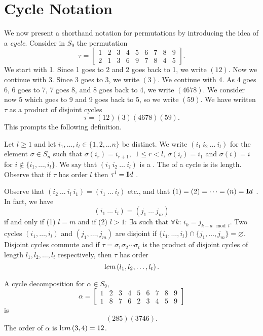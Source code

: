 \section{Cycle Notation} We now present a
shorthand notation for permutations by introducing the idea of a
{\em cycle}. Consider in $S_9$ the permutation
$$\tau = \begin{bmatrix} 1 & 2 & 3 & 4 & 5 & 6 & 7 & 8 & 9 \\
2 & 1 & 3 & 6 & 9 & 7 & 8 & 4 & 5 \end{bmatrix}.$$ We start with
1. Since 1 goes to 2 and 2 goes back to 1, we write $(12)$. Now we
continue with 3. Since 3 goes to 3, we write $(3)$. We continue
with 4. As 4 goes 6, 6 goes to 7, 7 goes 8, and 8 goes back to 4,
we write $(4678)$. We consider now $5$ which goes to 9 and 9 goes
back to 5, so we write $(59)$. We have written $\tau$ as a product
of disjoint cycles
$$\tau = (12)(3)(4678)(59).$$This prompts the following
definition.
\begin{df}
Let $l\geq 1$ and let $i_1,\ldots,i_l\in\{1,2,\ldots n\}$ be
distinct. We write  $(i_1\ i_2\ \ldots\ i_l)$ for the element
$\sigma\in S_n$ such that $\sigma(i_r)=i_{r+1}, \ \ 1\leq r<l$,
$\sigma(i_l)=i_1$ and  $\sigma(i)=i$ for
$i\not\in\{i_1,\ldots,i_l\}$. We say that  $(i_1\ i_2\ \ldots\
i_l)$ is a . The  of a cycle
is its length. Observe that if $\tau$ has order $l$ then $\tau^l =
{\mathbf Id\ }$.\end{df}
\begin{rem}
Observe that $(i_2\ \ldots\ i_l\ i_1)=(i_1\ \ldots\ i_l)$ etc.,
and that $(1)=(2)=\cdots=(n)= {\mathbf Id\ }$. In fact, we have
$$(i_1\ \ldots\ i_l)=(j_1\ \ldots\ j_m)$$ if and only if (1) $l=m$
and if  (2) $l>1$: $\exists a$ such that $\forall k$: $i_k =
j_{k+a \mod l}$. Two cycles $(i_1,\ldots,i_l)$ and
$(j_1,\ldots,j_m)$ are disjoint if $\{i_1, \ldots ,
i_l\}\cap\{j_1,  \ldots , j_m\}=\varnothing$. Disjoint cycles
commute and if $\tau = \sigma_1\sigma_2 \cdots \sigma_t$ is the
product of disjoint cycles of length $l_1, l_2, \ldots , l_t$
respectively, then $\tau$ has order
$$ {\mathrm lcm}\left(l_1, l_2, \ldots , l_t\right).$$
\end{rem}
\begin{exa}
A cycle decomposition for $\alpha\in S_9,$
$$\alpha = \begin{bmatrix} 1 & 2 & 3 & 4 & 5 & 6 & 7 & 8 & 9 \\
1 & 8 & 7 & 6 & 2 & 3 & 4 & 5 & 9 \end{bmatrix}$$ is
$$(285)(3746).$$ The order of $\alpha$ is ${\mathrm lcm}\left(3, 4\right) = 12$.
\label{ex:alpha}\end{exa}

